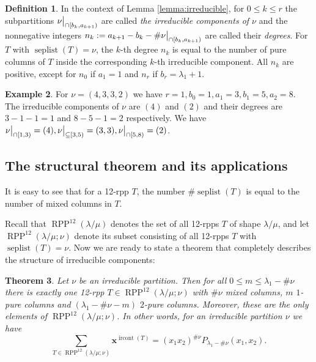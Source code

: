 \documentclass[12pt]{article}
\theoremstyle{plain}
\newtheorem{theorem}{Theorem}
\newtheorem{remark}[theorem]{Remark}
\theoremstyle{definition}
\newtheorem{definition}[theorem]{Definition}
\newtheorem{example}[theorem]{Example}
\let\sumnonlimits\sum
\renewcommand{\sum}{\sumnonlimits\limits}
\def\seplist{{\operatorname{seplist}}} %
\def\ircont{{\operatorname{ircont}}}
\def\seplistvar{{{\nu}}} %
\def\x{{\mathbf{x}}}
\def\lm{{\lambda/\mu}}
\def\OneTwoRPP{{\operatorname{RPP}^{12}\left(  \lambda/\mu\right)}}
\def\OneTwoRPPCutvar{{\operatorname{RPP}^{12}\left(  \lambda/\mu ;\seplistvar \right)}}
\begin{document}
\begin{definition}
 
 In the context of Lemma \ref{lemma:irreducible}, for $0\leq k\leq r$ the subpartitions $\nuxycap{b_k}{a_{k+1}}$ are called \textit{the irreducible components of $\seplistvar$} and the nonnegative integers $n_k:=a_{k+1}-b_k-\#\nuxycap{b_k}{a_{k+1}}$ are called their \textit{degrees}. For $T$ with $\seplist(T)=\seplistvar$, the $k$-th degree $n_k$ is equal to the number of pure columns of $T$ inside the corresponding $k$-th irreducible component. All $n_k$ are positive, except for $n_0$ if $a_1 = 1$ and $n_r$ if $b_r = \lambda_1 + 1$.
\end{definition}

\begin{example}
 For $\seplistvar=(4,3,3,2)$ we have $r=1,b_0=1,a_1=3,b_1=5,a_2=8$. The irreducible components of $\seplistvar$ are $(4)$ and $(2)$ and their degrees are $3-1-1=1$ and $8-5-1=2$ respectively. We have $\nuxycap{1}{3}=(4),\nuxy{3}{5}=(3,3),\nuxycap{5}{8}=(2)$.
\end{example}


\subsection{The structural theorem and its applications}
It is easy to see that for a 12-rpp $T$, the number $\#\seplist(T)$ is equal to the number of mixed columns in $T$.

Recall that $\OneTwoRPP$ denotes the set of all 12-rpps $T$ of shape $\lm$, and let $\OneTwoRPPCutvar$ denote its subset consisting of all 12-rpps $T$ with $\seplist(T)=\seplistvar$. Now we are ready to state a theorem that completely describes the structure of irreducible components:
\begin{theorem}
\label{thm:12rpps}
 Let $\seplistvar$ be an irreducible partition. Then for all $0\leq m\leq \lambda_1-\#\seplistvar$ there is exactly one 12-rpp $T\in\OneTwoRPPCutvar$ with $\#\seplistvar$ mixed columns, $m$ $1$-pure columns and $(\lambda_1-\#\seplistvar-m)$ $2$-pure columns. Moreover, these are the only elements of $\OneTwoRPPCutvar$. In other words, for an irreducible partition $\seplistvar$ we have
  \begin{equation}
 \label{eq:thm12rpps}
 \sum_{T\in\OneTwoRPPCutvar} \x^{\ircont(T)}=(x_1x_2)^{\#\seplistvar} P_{\lambda_1-\#\seplistvar}(x_1,x_2).
 \end{equation}
\end{theorem}
\end{document}
